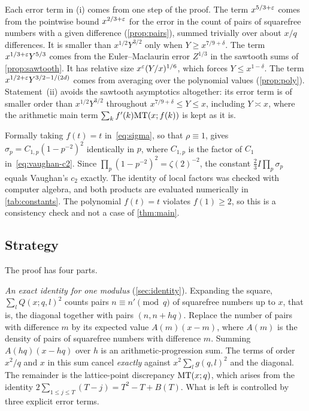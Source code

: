 \begin{remark}\label{rem:range}
Each error term in (i) comes from one step of the proof. The term $x^{5/3+\varepsilon}$ comes from the pointwise bound $x^{2/3+\varepsilon}$ for the error in the count of pairs of squarefree numbers with a given difference (\cref{prop:pairs}), summed trivially over about $x/q$ differences. It is smaller than $x^{1/2}Y^{3/2}$ only when $Y\ge x^{7/9+\delta}$. The term $x^{1/3+\varepsilon}Y^{5/3}$ comes from the Euler--Maclaurin error $Z^{1/3}$ in the sawtooth sums of \cref{prop:sawtooth}. It has relative size $x^\varepsilon(Y/x)^{1/6}$, which forces $Y\le x^{1-\delta}$. The term $x^{1/2+\varepsilon}Y^{3/2-1/(2d)}$ comes from averaging over the polynomial values (\cref{prop:poly}). Statement~(ii) avoids the sawtooth asymptotics altogether: its error term is of smaller order than $x^{1/2}Y^{3/2}$ throughout $x^{7/9+\delta}\le Y\le x$, including $Y\asymp x$, where the arithmetic main term $\sum_kf'(k)\mathrm{MT}(x;f(k))$ is kept as it is.
\end{remark}

\begin{remark}\label{rem:vaughan}
Formally taking $f(t)=t$ in~\eqref{eq:sigma}, so that $\rho\equiv1$, gives $\sigma_p=C_{1,p}(1-p^{-2})^2$ identically in $p$, where $C_{1,p}$ is the factor of $C_1$ in~\eqref{eq:vaughan-c2}. Since $\prod_p(1-p^{-2})^2=\zeta(2)^{-2}$, the constant $\frac23I\prod_p\sigma_p$ equals Vaughan's $c_2$ exactly. The identity of local factors was checked with computer algebra, and both products are evaluated numerically in \cref{tab:constants}. The polynomial $f(t)=t$ violates $f(1)\ge2$, so this is a consistency check and not a case of \cref{thm:main}.
\end{remark}

\subsection{Strategy}

The proof has four parts.

\emph{An exact identity for one modulus} (\cref{sec:identity}). Expanding the square, $\sum_lQ(x;q,l)^2$ counts pairs $n\equiv n'\pmod q$ of squarefree numbers up to $x$, that is, the diagonal together with pairs $(n,n+hq)$. Replace the number of pairs with difference $m$ by its expected value $A(m)(x-m)$, where $A(m)$ is the density of pairs of squarefree numbers with difference $m$. Summing $A(hq)(x-hq)$ over $h$ is an arithmetic-progression sum. The terms of order $x^2/q$ and $x$ in this sum cancel \emph{exactly} against $x^2\sum_lg(q,l)^2$ and the diagonal. The remainder is the lattice-point discrepancy $\mathrm{MT}(x;q)$, which arises from the identity $2\sum_{1\le j\le T}(T-j)=T^2-T+B(T)$. What is left is controlled by three explicit error terms.

